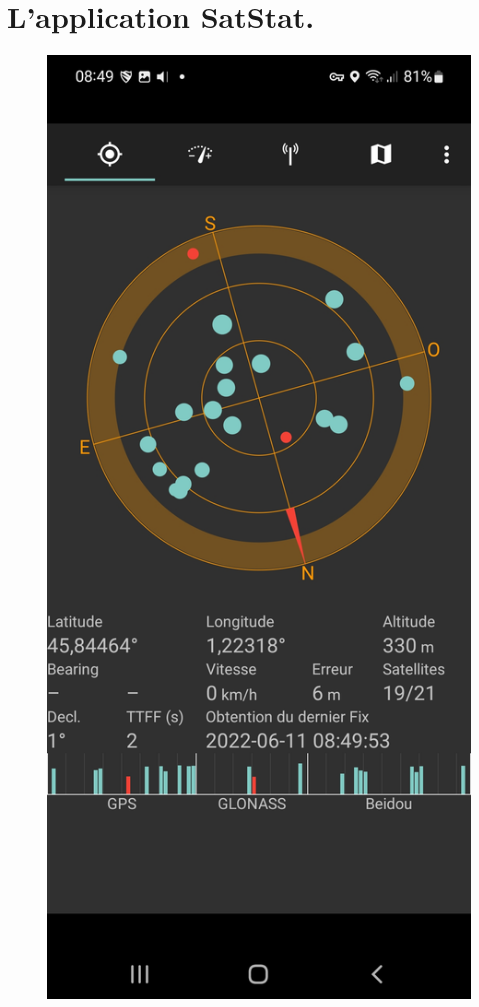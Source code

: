 \documentclass[12pt,a4paper,notitlepage,twoside]{article}
\begin{document}
\section*{L'application SatStat.}
\begin{multicols}{2}
\begin{figure}
	\centering
	\includegraphics{satstat.jpg}
\end{figure}


\end{multicols}
\end{document}
